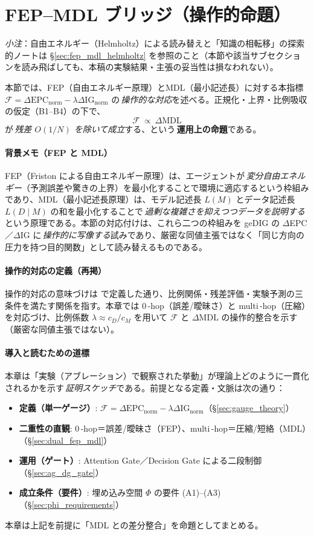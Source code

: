 \documentclass[ja=standard,xelatex]{bxjsarticle}
\newcommand{\F}{\mathcal{F}}
\newcommand{\gednorm}{\Delta\mathrm{EPC}_{\mathrm{norm}}}
\newcommand{\ignorm}{\Delta\mathrm{IG}_{\mathrm{norm}}}
\begin{document}
\section{FEP–MDL ブリッジ（操作的命題）}
\label{sec:fep_mdl_bridge}
\noindent\textit{小注}：自由エネルギー（Helmholtz）による読み替えと「知識の相転移」の探索的ノートは \S\ref{sec:fep_mdl_helmholtz} を参照のこと（本節や該当サブセクションを読み飛ばしても、本稿の実験結果・主張の妥当性は損なわれない）。

本節では、FEP（自由エネルギー原理）とMDL（最小記述長）に対する本指標 $\F=\gednorm-\lambda\ignorm$ の\,\emph{操作的な対応}を述べる。正規化・上界・比例吸収の仮定（B1–B4）の下で、
\[\;\F\ \propto\ \Delta\mathrm{MDL}\;\]
が\,\emph{残差 $O(1/N)$ を除いて成立}する、という\,\textbf{運用上の命題}である。

\paragraph{背景メモ（FEP と MDL）}\;
FEP（Friston による自由エネルギー原理）は、エージェントが\,\emph{変分自由エネルギー}（予測誤差や驚きの上界）を最小化することで環境に適応するという枠組みであり、MDL（最小記述長原理）は、モデル記述長 $L(M)$ とデータ記述長 $L(D\mid M)$ の和を最小化することで\,\emph{過剰な複雑さを抑えつつデータを説明する}という原理である。本節の対応付けは、これら二つの枠組みを geDIG の $\Delta$EPC／$\Delta$IG に\,\emph{操作的に写像する}試みであり、厳密な同値主張ではなく「同じ方向の圧力を持つ目的関数」として読み替えるものである。

\paragraph{操作的対応の定義（再掲）}
操作的対応の意味づけは  で定義した通り、比例関係・残差評価・実験予測の三条件を満たす関係を指す。本章では 0\,\mbox{-}hop（誤差/曖昧さ）と multi\,\mbox{-}hop（圧縮）を対応づけ、比例係数 $\lambda\approx c_{\!D}/c_{\!M}$ を用いて $\F$ と $\Delta\mathrm{MDL}$ の操作的整合を示す（厳密な同値主張ではない）。

\paragraph{導入と読むための道標}
本章は「実験（アブレーション）で観察された挙動」が理論上どのように一貫化されるかを示す\,\emph{証明スケッチ}である。前提となる定義・文脈は次の通り：
\begin{itemize}[leftmargin=*]
  \item \textbf{定義（単一ゲージ）}: $\F=\gednorm-\lambda\ignorm$（\S\ref{sec:gauge_theory}）
  \item \textbf{二重性の直観}: 0\,\mbox{-}hop＝誤差/曖昧さ（FEP）、multi\,\mbox{-}hop＝圧縮/短絡（MDL）（\S\ref{sec:dual_fep_mdl}）
  \item \textbf{運用（ゲート）}: Attention Gate／Decision Gate による二段制御（\S\ref{sec:ag_dg_gate}）
  \item \textbf{成立条件（要件）}: 埋め込み空間 $\Phi$ の要件 (A1)--(A3)（\S\ref{sec:phi_requirements}）
\end{itemize}
本章は上記を前提に「MDL との差分整合」を命題としてまとめる。
\end{document}
